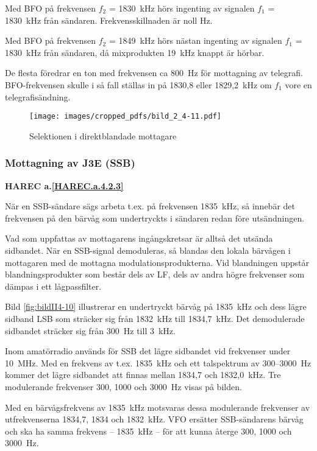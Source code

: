 Med BFO på frekvensen \(f_2\) = 1830~kHz hörs ingenting av signalen
\(f_1\) = 1830~kHz från sändaren.
Frekvensskillnaden är noll Hz.

Med BFO på frekvensen \(f_2\) = 1849~kHz hörs nästan ingenting av signalen
\(f_1\) = 1830~kHz från sändaren, då mixprodukten 19~kHz knappt är hörbar.

De flesta föredrar en ton med frekvensen ca 800~Hz för mottagning av telegrafi.
BFO-frekvensen skulle i så fall ställas in på 1830,8 eller
1829,2~kHz om \(f_1\) vore en telegrafisändning.

\begin{figure}
  \texttt{[image: images/cropped\_pdfs/bild\_2\_4-11.pdf]}
  \caption{Selektionen i direktblandade mottagare}
  \label{fig:bildII4-11}
\end{figure}

\subsubsection{Mottagning av J3E (SSB)}
\textbf{HAREC a.\ref{HAREC.a.4.2.3}\label{myHAREC.a.4.2.3}}

När en SSB-sändare sägs arbeta t.ex. på frekvensen 1835~kHz, så
innebär det frekvensen på den bärvåg som undertryckts i sändaren redan
före utsändningen.

Vad som uppfattas av mottagarens ingångskretsar är alltså det utsända sidbandet.
När en SSB-signal demoduleras, så blandas den lokala bärvågen i mottagaren med
de mottagna modulationsprodukterna.
Vid blandningen uppstår blandningsprodukter som består dels av LF, dels av
andra högre frekvenser som dämpas i ett lågpassfilter.

Bild \ref{fig:bildII4-10} illustrerar en undertryckt bärvåg på 1835~kHz och
dess lägre sidband LSB som sträcker sig från 1832~kHz till 1834,7~kHz.
Det demodulerade sidbandet sträcker sig från 300~Hz till 3~kHz.

Inom amatörradio används för SSB det lägre sidbandet vid frekvenser
under 10~MHz.
Med en frekvens av t.ex. 1835~kHz och ett talspektrum av 300--3000~Hz kommer
det lägre sidbandet att finnas mellan 1834,7 och 1832,0~kHz.
Tre modulerande frekvenser 300, 1000 och 3000~Hz visas på bilden.

Med en bärvågsfrekvens av 1835~kHz motsvaras dessa modulerande
frekvenser av utfrekvenserna 1834,7, 1834 och 1832~kHz.
VFO ersätter SSB-sändarens bärvåg och ska ha samma frekvens -- 1835~kHz --
för att kunna återge 300, 1000 och 3000~Hz.

